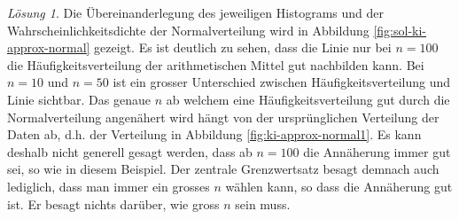 \documentclass[
]{book}
\theoremstyle{definition}
\theoremstyle{definition}
\theoremstyle{definition}
\theoremstyle{definition}
\theoremstyle{remark}
\newtheorem*{solution}{Lösung}
\begin{document}
\begin{solution}

Die Übereinanderlegung des jeweiligen Histograms und der Wahrscheinlichkeitsdichte der Normalverteilung wird in Abbildung \ref{fig:sol-ki-approx-normal} gezeigt. Es ist deutlich zu sehen, dass die Linie nur bei \(n=100\) die Häufigkeitsverteilung der arithmetischen Mittel gut nachbilden kann. Bei \(n=10\) und \(n=50\) ist ein grosser Unterschied zwischen Häufigkeitsverteilung und Linie sichtbar. Das genaue \(n\) ab welchem eine Häufigkeitsverteilung gut durch die Normalverteilung angenähert wird hängt von der ursprünglichen Verteilung der Daten ab, d.h. der Verteilung in Abbildung \ref{fig:ki-approx-normal1}. Es kann deshalb nicht generell gesagt werden, dass ab \(n=100\) die Annäherung immer gut sei, so wie in diesem Beispiel. Der zentrale Grenzwertsatz besagt demnach auch lediglich, dass man immer ein grosses \(n\) wählen kann, so dass die Annäherung gut ist. Er besagt nichts darüber, wie gross \(n\) sein muss.


\end{solution}
\end{document}
